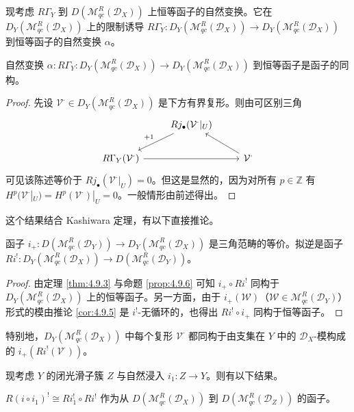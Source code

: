 现考虑 $R\Gamma_Y$ 到 $D(\mathcal{M}^R_{qc}(\mathcal{D}_X))$ 上恒等函子的自然变换。它在 $D_Y(\mathcal{M}^R_{qc}(\mathcal{D}_X))$ 上的限制诱导
$R\Gamma_Y:D_Y(\mathcal{M}^R_{qc}(\mathcal{D}_X))\to D_Y(\mathcal{M}^R_{qc}(\mathcal{D}_X))$ 到恒等函子的自然变换 $\alpha$。

\begin{proposition}\label{prop:4.9.6}
自然变换 $\alpha:R\Gamma_Y:D_Y(\mathcal{M}^R_{qc}(\mathcal{D}_X))\to D_Y(\mathcal{M}^R_{qc}(\mathcal{D}_X))$ 到恒等函子是函子的同构。
\end{proposition}

\begin{proof}
先设 $\mathcal{V}^\cdot\in D_Y(\mathcal{M}^R_{qc}(\mathcal{D}_X))$ 是下方有界复形。则由可区别三角
$$\begin{tikzcd}
& Rj_\bullet(\mathcal{V}^\cdot|_U) \arrow[dl,"+1"'] & \\
R\Gamma_Y(\mathcal{V}^\cdot) \arrow[rr] && \mathcal{V}^\cdot \arrow[lu]
\end{tikzcd}$$
可见该陈述等价于 $Rj_\bullet(\mathcal{V}^\cdot|_U)=0$。但这是显然的，因为对所有 $p\in\mathbb{Z}$ 有
$H^p(\mathcal{V}^\cdot|_U)=H^p(\mathcal{V}^\cdot)|_U=0$。一般情形由前述得出。
\end{proof}

这个结果结合 Kashiwara 定理，有以下直接推论。

\begin{theorem}\label{thm:4.9.7}
函子 $i_+:D(\mathcal{M}^R_{qc}(\mathcal{D}_Y))\to D_Y(\mathcal{M}^R_{qc}(\mathcal{D}_X))$ 是三角范畴的等价。拟逆是函子
$Ri^!:D_Y(\mathcal{M}^R_{qc}(\mathcal{D}_X))\to D(\mathcal{M}^R_{qc}(\mathcal{D}_Y))$。
\end{theorem}

\begin{proof}
由定理 \ref{thm:4.9.3} 与命题 \ref{prop:4.9.6} 可知 $i_+\circ Ri^!$ 同构于 $D_Y(\mathcal{M}^R_{qc}(\mathcal{D}_X))$ 上的恒等函子。另一方面，由于
$i_+(\mathcal{W})$（$\mathcal{W}\in\mathcal{M}^R_{qc}(\mathcal{D}_Y)$）形式的模由推论 \ref{cor:4.9.5} 是 $i^!$-无循环的，也得出 $Ri^!\circ i_+$ 同构于恒等函子。
\end{proof}

特别地，$D_Y(\mathcal{M}^R_{qc}(\mathcal{D}_X))$ 中每个复形 $\mathcal{V}^\cdot$ 都同构于由支集在 $Y$ 中的 $\mathcal{D}_X$-模构成的 $i_+(Ri^!(\mathcal{V}^\cdot))$。

现考虑 $Y$ 的闭光滑子簇 $Z$ 与自然浸入 $i_1:Z\to Y$。则有以下结果。

\begin{theorem}\label{thm:4.9.8}
$R(i\circ i_1)^!\cong Ri_1^!\circ Ri^!$ 作为从 $D(\mathcal{M}^R_{qc}(\mathcal{D}_X))$ 到
$D(\mathcal{M}^R_{qc}(\mathcal{D}_Z))$ 的函子。
\end{theorem}

